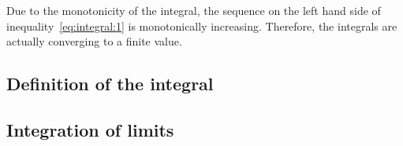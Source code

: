 \begin{remark}
  \label{remark:integral:1}
  Due to the monotonicity of the integral, the sequence on the left
  hand side of inequality~\eqref{eq:integral:1} is monotonically
  increasing. Therefore, the integrals are actually converging to a
  finite value.
\end{remark}

\subsection{Definition of the integral}




\subsection{Integration of limits}

